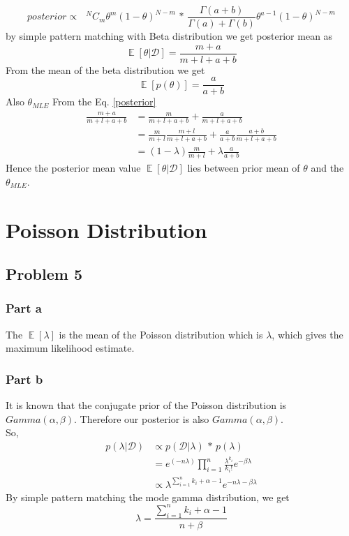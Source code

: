 \documentclass[5pt,a4paper]{article}
\begin{document}
\begin{equation*}
posterior \propto \text{ }^NC_m \theta^m(1-\theta)^{N-m} \text{ * } \frac{\Gamma(a+b)}{\Gamma(a)+\Gamma(b)}\theta^{a-1}(1-\theta)^{N-m}
\end{equation*}
by simple pattern matching with Beta distribution we get posterior mean as\\
\begin{equation}
\mathop{\mathbb{E}}[\theta|\mathcal{D}]=\frac{m+a}{m+l+a+b}\label{posterior}
\end{equation}
From the mean of the beta distribution we get 
\begin{equation}
\mathop{\mathbb{E}}[p(\theta)]=\frac{a}{a+b}
\end{equation}
Also $\theta_{MLE}$
From the Eq. \ref{posterior}
\begin{eqnarray}
\frac{m+a}{m+l+a+b}&=\frac{m}{m+l+a+b}+\frac{a}{m+l+a+b}\\
&=\frac{m}{m+l}\frac{m+l}{m+l+a+b}+\frac{a}{a+b}\frac{a+b}{m+l+a+b}\\
&=(1-\lambda)\frac{m}{m+l}+\lambda \frac{a}{a+b}
\end{eqnarray}
Hence the posterior mean value $\mathop{\mathbb{E}}[\theta|\mathcal{D}]$ lies between prior mean of $\theta$ and the $\theta_{MLE}$.
	
\section{Poisson Distribution}
\subsection*{Problem 5}
\subsubsection*{Part a}
The $\mathop{\mathbb{E}}[\lambda]$ is the mean of the Poisson distribution which is $\lambda$, which gives the maximum likelihood estimate.

\subsubsection*{Part b}
It is known that the conjugate prior of the Poisson distribution is $Gamma(\alpha,\beta)$. Therefore our posterior is also $Gamma(\alpha,\beta)$.\\
So,
\begin{eqnarray*}
p(\lambda|\mathcal{D}) & \propto p(\mathcal{D}|\lambda)\text{ * } p(\lambda) \\
&=e^{(-n \lambda)} \prod_{i=1}^n \frac{\lambda^{k_i}}{k_i!}e^{-\beta \lambda}\\
& \propto \lambda^{\sum_{i=1}^{n}k_i+\alpha-1}e^{-n\lambda-\beta\lambda}
\end{eqnarray*}
By simple pattern matching the mode gamma distribution, we get
\begin{equation}
\lambda=\frac{\sum_{i=1}^{n}k_i+\alpha -1}{n+\beta}
\end{equation}


	
	
\end{document}
